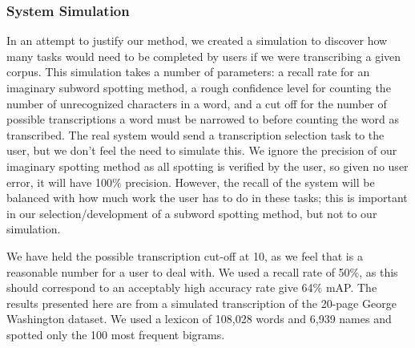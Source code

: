 \documentclass[ms]{byuprop}
\begin{document}
\subsubsection{System Simulation}
In an attempt to justify our method, we created a simulation to discover how many tasks would need to be completed by users if we were transcribing a given corpus. This simulation takes a number of parameters: a recall rate for an imaginary subword spotting method, a rough confidence level for counting the number of unrecognized characters in a word, and a cut off for the number of possible transcriptions a word must be narrowed to before counting the word as transcribed. The real system would send a transcription selection task to the user, but we don't feel the need to simulate this. We ignore the precision of our imaginary spotting method as all spotting is verified by the user, so given no user error, it will have 100\% precision. However, the recall of the system will be balanced with how much work the user has to do in these tasks; this is important in our selection/development of a subword spotting method, but not to our simulation.





We have held the possible transcription cut-off at 10, as we feel that is a reasonable number for a user to deal with. We used a recall rate of 50\%, as this should correspond to an acceptably high accuracy rate give 64\% mAP. The results presented here are from a simulated transcription of the 20-page George Washington dataset. We used a lexicon of 108,028 words and 6,939 names and spotted only the 100 most frequent bigrams.
\end{document}
